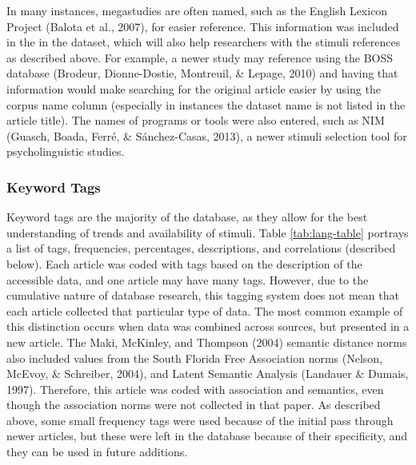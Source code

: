 \documentclass[english,man]{apa6}
\theoremstyle{definition}
\theoremstyle{definition}
\theoremstyle{definition}
\theoremstyle{remark}
\begin{document}
In many instances, megastudies are often named, such as the English
Lexicon Project (Balota et al., 2007), for easier reference. This
information was included in the in the dataset, which will also help
researchers with the stimuli references as described above. For example,
a newer study may reference using the BOSS database (Brodeur,
Dionne-Dostie, Montreuil, \& Lepage, 2010) and having that information
would make searching for the original article easier by using the corpus
name column (especially in instances the dataset name is not listed in
the article title). The names of programs or tools were also entered,
such as NIM (Guasch, Boada, Ferré, \& Sánchez-Casas, 2013), a newer
stimuli selection tool for psycholinguistic studies.

\subsubsection{Keyword Tags}\label{keyword-tags}

Keyword tags are the majority of the database, as they allow for the
best understanding of trends and availability of stimuli. Table
\ref{tab:lang-table} portrays a list of tags, frequencies, percentages,
descriptions, and correlations (described below). Each article was coded
with tags based on the description of the accessible data, and one
article may have many tags. However, due to the cumulative nature of
database research, this tagging system does not mean that each article
collected that particular type of data. The most common example of this
distinction occurs when data was combined across sources, but presented
in a new article. The Maki, McKinley, and Thompson (2004) semantic
distance norms also included values from the South Florida Free
Association norms (Nelson, McEvoy, \& Schreiber, 2004), and Latent
Semantic Analysis (Landauer \& Dumais, 1997). Therefore, this article
was coded with association and semantics, even though the association
norms were not collected in that paper. As described above, some small
frequency tags were used because of the initial pass through newer
articles, but these were left in the database because of their
specificity, and they can be used in future additions.
\end{document}
